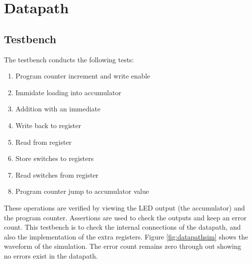 


\section{Datapath}\label{sect:datapath}
\subsection{Testbench}
The testbench conducts the following tests:
\begin{enumerate}
\item Program counter increment and write enable
\item Immidate loading into accumulator
\item Addition with an immediate
\item Write back to register
\item Read from register
\item Store switches to registers
\item Read switches from register
\item Program counter jump to accumulator value
\end{enumerate}

These operations are verified by viewing the LED output (the accumulator) and the program counter.
Assertions are used to check the outputs and keep an error count. 
This testbench is to check the internal connections of the datapath, and also the implementation of the extra registers.
Figure \ref{fig:datapathsim} shows the waveform of the simulation. 
The error count remains zero through out showing no errors exist in the datapath.

